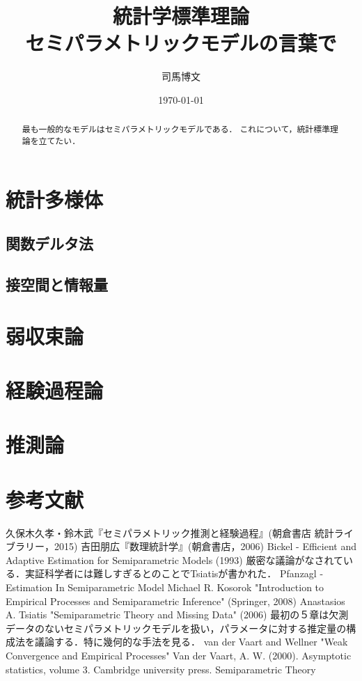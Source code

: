 \documentclass[uplatex,dvipdfmx]{jsreport}
\title{統計学標準理論\\セミパラメトリックモデルの言葉で}
\author{司馬博文}
\date{\today}
\begin{document}
\tableofcontents

\begin{abstract}
    最も一般的なモデルはセミパラメトリックモデルである．
    これについて，統計標準理論を立てたい．
\end{abstract}

\chapter{統計多様体}

\section{関数デルタ法}

\section{接空間と情報量}

\chapter{弱収束論}

\chapter{経験過程論}

\chapter{推測論}

\chapter{参考文献}

\begin{thebibliography}{99}
    久保木久孝・鈴木武『セミパラメトリック推測と経験過程』(朝倉書店 統計ライブラリー，2015)
    吉田朋広『数理統計学』(朝倉書店，2006)
    Bickel - Efficient and Adaptive Estimation for Semiparametric Models (1993)
    厳密な議論がなされている．実証科学者には難しすぎるとのことでTsiatisが書かれた．
    Pfanzagl - Estimation In Semiparametric Model
    Michael R. Kosorok "Introduction to Empirical Processes and Semiparametric Inference" (Springer, 2008)
    Anastasios A. Tsiatis "Semiparametric Theory and Missing Data" (2006)
    最初の５章は欠測データのないセミパラメトリックモデルを扱い，パラメータに対する推定量の構成法を議論する．特に幾何的な手法を見る．
    van der Vaart and Wellner "Weak Convergence and Empirical Processes"
    Van der Vaart, A. W. (2000). Asymptotic statistics, volume 3. Cambridge university press.
    Semiparametric Theory
\end{thebibliography}
\end{document}

